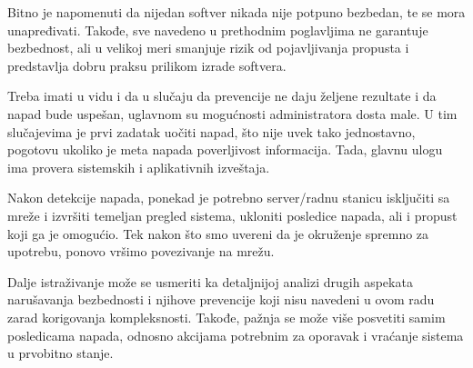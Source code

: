 \documentclass[a4paper]{article}
\begin{document}
Bitno je napomenuti da nijedan softver nikada nije potpuno bezbedan, te se mora unapređivati. Takođe, sve navedeno u prethodnim poglavljima ne garantuje bezbednost, ali u velikoj meri smanjuje rizik od pojavljivanja propusta i predstavlja dobru praksu prilikom izrade softvera.

Treba imati u vidu i da u slučaju da prevencije ne daju željene rezultate i da napad bude uspešan, uglavnom su mogućnosti administratora dosta male. U tim slučajevima je prvi zadatak uočiti napad, što nije uvek tako jednostavno, pogotovu ukoliko je meta napada poverljivost informacija. Tada, glavnu ulogu ima provera sistemskih i aplikativnih izveštaja.

Nakon detekcije napada, ponekad je potrebno server/radnu stanicu isključiti sa mreže i izvršiti temeljan pregled sistema, ukloniti posledice napada, ali i propust koji ga je omogućio. Tek nakon što smo uvereni da je okruženje spremno za upotrebu, ponovo vršimo povezivanje na mrežu.

Dalje istraživanje može se usmeriti ka detaljnijoj analizi drugih aspekata narušavanja bezbednosti i njihove prevencije koji nisu navedeni u ovom radu zarad korigovanja kompleksnosti. Takođe, pažnja se može više posvetiti samim posledicama napada, odnosno akcijama potrebnim za oporavak i vraćanje sistema u prvobitno stanje.


\nocite{*}
\appendix
{}


\end{document}
